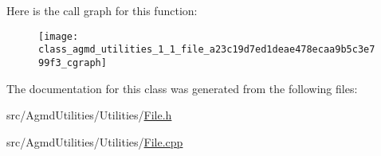 Here is the call graph for this function\+:\nopagebreak
\begin{figure}[H]
\begin{center}
\leavevmode
\texttt{[image: class\_agmd\_utilities\_1\_1\_file\_a23c19d7ed1deae478ecaa9b5c3e799f3\_cgraph]}
\end{center}
\end{figure}




The documentation for this class was generated from the following files\+:\begin{DoxyCompactItemize}
\item 
src/\+Agmd\+Utilities/\+Utilities/\hyperlink{_file_8h}{File.\+h}\item 
src/\+Agmd\+Utilities/\+Utilities/\hyperlink{_file_8cpp}{File.\+cpp}\end{DoxyCompactItemize}
